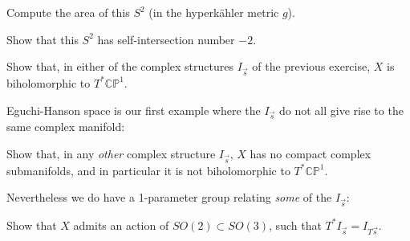 \documentclass[12pt,letterpaper,reqno]{amsart}
\numberwithin{equation}{section}
\newcommand{\C}{\ensuremath{\mathbb C}}
\newcommand{\PP}{\ensuremath{\mathbb P}}
\newcommand{\hk}{hyperk\"ahler\xspace}
\newcommand{\ti}[1]{\textit{#1}}
\newcommand{\fixme}[1]{{\color{blue}{[#1]}}}
\begin{document}
\begin{exercise}
Compute the area of this $S^2$ (in the \hk metric $g$).
\end{exercise}

\begin{exercise}
Show that this $S^2$ has self-intersection number $-2$. \fixme{warning, this one might be hard}
\end{exercise}

\begin{exercise}
Show that, in either of the complex structures 
$I_{\vec s}$ of the previous
exercise, $X$ is biholomorphic to $T^* \C\PP^1$. \fixme{warning,
this one might be hard}
\end{exercise}

Eguchi-Hanson space is our first example where the $I_{\vec s}$ do not all give rise to the same complex manifold:
\begin{exercise}
Show that, in any \ti{other} complex structure $I_{\vec s}$,
$X$ has no compact complex submanifolds, and in particular 
it is not biholomorphic to $T^* \C\PP^1$.
\end{exercise}

Nevertheless we do have a 1-parameter group relating 
\ti{some} of the $I_{\vec s}$:
\begin{exercise}
Show that $X$ admits an action of $SO(2) \subset SO(3)$,
such that $T^* I_{\vec s} = I_{T \vec{s}}$.
\end{exercise}
\end{document}
